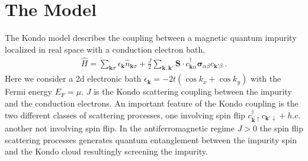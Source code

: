 \documentclass[aps,prl,preprint,groupedaddress]{revtex4-2}
\begin{document}
\section{The Model}
The Kondo model\cite{kondo1964resistance,anderson1970poor} describes the coupling between a magnetic quantum impurity localized in real space with a conduction electron bath,
\begin{eqnarray}
\hat{H} = \sum_{\mathbf{k}\sigma}\epsilon_{\mathbf{k}}\hat{n}_{\mathbf{k}\sigma}+\frac{J}{2}\sum_{\mathbf{k},\mathbf{k}'}\mathbf{S}\cdot c^{\dagger}_{\mathbf{k}\alpha}\boldsymbol{\sigma}_{\alpha\beta}c_{\mathbf{k}'\beta}~.\label{KondoH}
\end{eqnarray}
Here we consider a 2d electronic bath $\epsilon_{\mathbf{k}}=-2t(\cos k_{x}+\cos k_{y})$ with the Fermi energy $E_{F}=\mu$. $J$ is the Kondo scattering coupling between the impurity and the conduction electrons. An important feature of the Kondo coupling is the two different classes of scattering processes, one involving spin flip $c^{\dagger}_{\mathbf{k}\uparrow}c_{\mathbf{k}'\downarrow}+h.c.$ another not involving spin flip. In the antiferromagnetic regime $J>0$ the spin flip scattering processes generates quantum entanglement between the impurity spin and the Kondo cloud resultingly screening the impurity.
\end{document}
